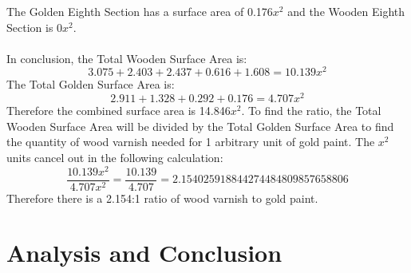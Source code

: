 \documentclass[a4paper,12pt]{article}
\begin{document}
The Golden Eighth Section has a surface area of 0.176$x^2$ and the Wooden Eighth Section is 0$x^2$.
\\\\In conclusion, the Total Wooden Surface Area is: $$3.075+2.403+2.437+0.616+1.608=10.139x^2$$ The Total Golden Surface Area is: $$2.911+1.328+0.292+0.176=4.707x^2$$ Therefore the combined surface area is 14.846$x^2$. To find the ratio, the Total Wooden Surface Area will be divided by the Total Golden Surface Area to find the quantity of wood varnish needed for 1 arbitrary unit of gold paint. The $x^2$ units cancel out in the following calculation: 
$$\frac{10.139x^2}{4.707x^2}=\frac{10.139}{4.707}=2.154025918844274484809857658806$$
Therefore there is a 2.154:1 ratio of wood varnish to gold paint.


\section{Analysis and Conclusion}
\end{document}

